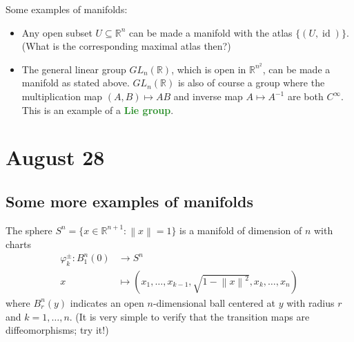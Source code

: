 \documentclass[11pt]{scrartcl}
\providecommand{\RR}{\mathbb R}
\providecommand{\ii}{\item}
\providecommand{\inv}{^{-1}}
\providecommand{\vocab}[1]{{\textbf{\textcolor{ForestGreen}{#1}}}}
\providecommand{\norm}[1]{\left\|#1\right\|}
\begin{document}
\begin{example}
    Some examples of manifolds:
    \begin{itemize}
        \ii Any open subset $U\subseteq\RR^n$ can be made a manifold
	with the atlas $\{(U,\operatorname{id})\}$.
	(What is the corresponding maximal atlas then?)
	\ii The general linear group $GL_n(\RR)$,
	which is open in $\RR^{n^2}$, can be made a manifold
	as stated above. $GL_n(\RR)$ is also of course a group
	where the multiplication map $(A,B)\mapsto AB$ and
	inverse map $A\mapsto A\inv$ are both $C^\infty$.
	This is an example of a \vocab{Lie group}.
    \end{itemize}
\end{example}

\section{August 28}\label{sec:aug28}
\subsection{Some more examples of manifolds}

The sphere $S^n = \{ x\in\RR^{n+1} : \norm{x} = 1\}$ is
a manifold of dimension of $n$ with charts
\begin{align*}
    \varphi_k^{\pm} : B^n_1(0)&\to S^n\\
    x &\mapsto
    (x_1,\dots,x_{k-1},\sqrt{1-\norm{x}^2},x_k,\dots,x_n)
\end{align*}
where $B^n_r(y)$ indicates an open $n$-dimensional ball
centered at $y$ with radius $r$ and $k=1,\dots,n$.
(It is very simple to verify that the transition maps
are diffeomorphisms; try it!)
\end{document}
